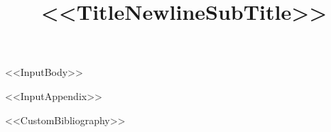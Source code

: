 \documentclass[%
OJMO,
Unicode,
english,
manuscript,
<<DocumentClassOptions>>]{cedram}
\title[<<ShortTitle>>]{<<TitleNewlineSubTitle>>}
\begin{document}
\maketitle

<<InputBody>>

\appendix
<<InputAppendix>>


<<CustomBibliography>>
\end{document}
